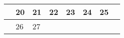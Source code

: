 {\begin{tabularx}{\linewidth}{|l!{\vrule width \myLenLineThicknessThick}*{7}{@{}X@{}|}}
       & 
    
      
      
        \begin{minipage}[t]{6mm}\centering{}20\end{minipage}
      
       & 
    
      
      
        \begin{minipage}[t]{6mm}\centering{}21\end{minipage}
      
       & 
    
      
      
        \begin{minipage}[t]{6mm}\centering{}22\end{minipage}
      
       & 
    
      
      
        \begin{minipage}[t]{6mm}\centering{}23\end{minipage}
      
       & 
    
      
      
        \begin{minipage}[t]{6mm}\centering{}24\end{minipage}
      
       & 
    
      
      
        \begin{minipage}[t]{6mm}\centering{}25\end{minipage}
      
      
        \\  \hline 
      
    
  
  
  
  \hyperlink{week-2026-4}{} &
    
      
      
        \begin{minipage}[t]{6mm}\centering{}26\end{minipage}
      
       & 
    
      
      
        \begin{minipage}[t]{6mm}\centering{}27\end{minipage}
      

\end{tabularx}}
